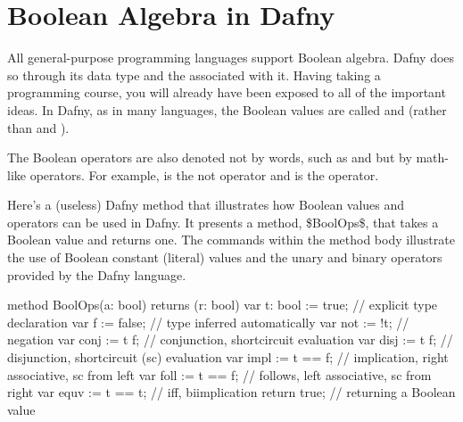 \documentclass[letterpaper,10pt,english]{sphinxmanual}
\begin{document}
\section{Boolean Algebra in Dafny}
\label{\detokenize{08-boolean-algebra:boolean-algebra-in-dafny}}
All general-purpose programming languages support Boolean
algebra. Dafny does so through its  data type and the
 associated with it. Having taking a programming course,
you will already have been exposed to all of the important ideas.
In Dafny, as in many languages, the Boolean values are called
 and  (rather than  and ).

The Boolean operators are also denoted not by words, such as  and
 but by math-like operators. For example, \sphinxstyleemphasis{!} is the not operator
and \sphinxstyleemphasis{\textbar{}\textbar{}} is the  operator.

Here’s a (useless) Dafny method that illustrates how Boolean values
and operators can be used in Dafny. It presents a method, \$BoolOps\$,
that takes a Boolean value and returns one. The commands within the
method body illustrate the use of Boolean constant (literal) values
and the unary and binary operators provided by the Dafny language.

\begin{sphinxVerbatim}[commandchars=\\\{\}]
method BoolOps(a: bool) returns (r: bool)
\PYGZob{}
    var t: bool := true;    // explicit type declaration
    var f := false;         // type inferred automatically
    var not := !t;          // negation
    var conj := t \PYGZam{}\PYGZam{} f;     // conjunction, short\PYGZhy{}circuit evaluation
    var disj := t \textbar{}\textbar{} f;     // disjunction, short\PYGZhy{}circuit (sc) evaluation
    var impl := t ==\PYGZgt{} f;    // implication, right associative, sc from left
    var foll := t \PYGZlt{}== f;    // follows, left associative, sc from right
    var equv := t \PYGZlt{}==\PYGZgt{} t;   // iff, bi\PYGZhy{}implication
    return true;            // returning a Boolean value
 \PYGZcb{}
\end{sphinxVerbatim}
\end{document}
